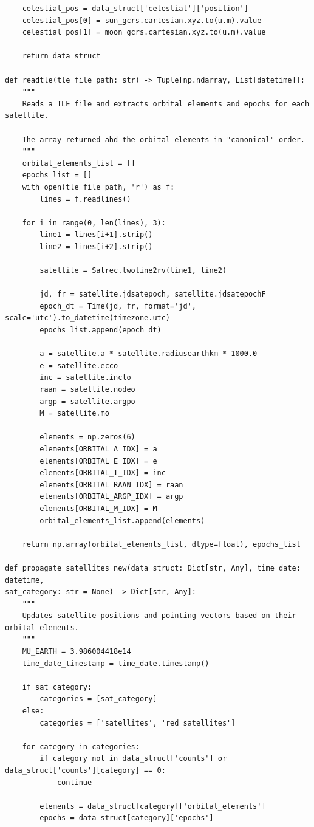 \documentclass[11pt]{article}
\begin{document}
\begin{Verbatim}
    celestial_pos = data_struct['celestial']['position']
    celestial_pos[0] = sun_gcrs.cartesian.xyz.to(u.m).value
    celestial_pos[1] = moon_gcrs.cartesian.xyz.to(u.m).value

    return data_struct

def readtle(tle_file_path: str) -> Tuple[np.ndarray, List[datetime]]:
    """
    Reads a TLE file and extracts orbital elements and epochs for each satellite.

    The array returned ahd the orbital elements in "canonical" order.
    """
    orbital_elements_list = []
    epochs_list = []
    with open(tle_file_path, 'r') as f:
        lines = f.readlines()

    for i in range(0, len(lines), 3):
        line1 = lines[i+1].strip()
        line2 = lines[i+2].strip()

        satellite = Satrec.twoline2rv(line1, line2)

        jd, fr = satellite.jdsatepoch, satellite.jdsatepochF
        epoch_dt = Time(jd, fr, format='jd', scale='utc').to_datetime(timezone.utc)
        epochs_list.append(epoch_dt)

        a = satellite.a * satellite.radiusearthkm * 1000.0
        e = satellite.ecco
        inc = satellite.inclo
        raan = satellite.nodeo
        argp = satellite.argpo
        M = satellite.mo

        elements = np.zeros(6)
        elements[ORBITAL_A_IDX] = a
        elements[ORBITAL_E_IDX] = e
        elements[ORBITAL_I_IDX] = inc
        elements[ORBITAL_RAAN_IDX] = raan
        elements[ORBITAL_ARGP_IDX] = argp
        elements[ORBITAL_M_IDX] = M
        orbital_elements_list.append(elements)

    return np.array(orbital_elements_list, dtype=float), epochs_list

def propagate_satellites_new(data_struct: Dict[str, Any], time_date: datetime,
sat_category: str = None) -> Dict[str, Any]:
    """
    Updates satellite positions and pointing vectors based on their orbital elements.
    """
    MU_EARTH = 3.986004418e14
    time_date_timestamp = time_date.timestamp()

    if sat_category:
        categories = [sat_category]
    else:
        categories = ['satellites', 'red_satellites']

    for category in categories:
        if category not in data_struct['counts'] or data_struct['counts'][category] == 0:
            continue

        elements = data_struct[category]['orbital_elements']
        epochs = data_struct[category]['epochs']


\end{Verbatim}
\end{document}
